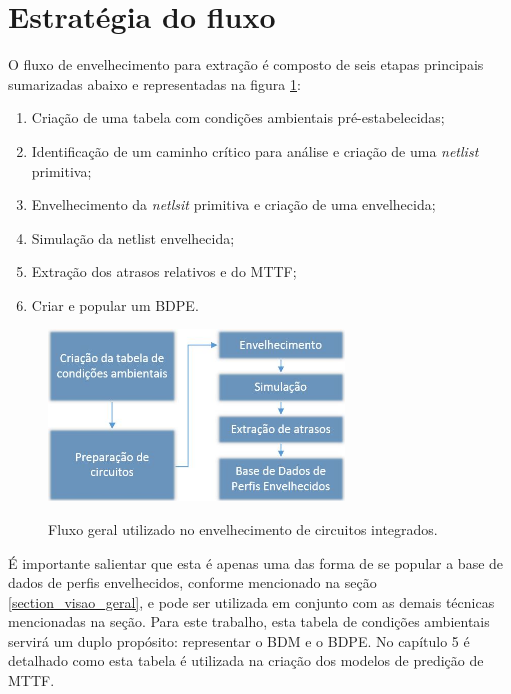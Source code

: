 \section{Estratégia do fluxo}
\label{section_estrategia_fluxo}
O fluxo de envelhecimento para extração é composto de seis etapas principais sumarizadas abaixo e representadas na figura \ref{figure:fluxo_geral}:
\begin{enumerate}
	\item Criação de uma tabela com condições ambientais pré-estabelecidas;
	\item Identificação de um caminho crítico para análise e criação de uma \textit{netlist} primitiva;
	\item Envelhecimento da \textit{netlsit} primitiva e criação de uma envelhecida;
	\item Simulação da netlist envelhecida;
	\item Extração dos atrasos relativos e do MTTF;
	\item Criar e popular um BDPE.
\end{enumerate}
\begin{figure}[H]
\center
{\includegraphics[width=0.7\textwidth]{images/fluxo_geral}}
\caption{Fluxo geral utilizado no envelhecimento de circuitos integrados.}
\label{figure:fluxo_geral}
\end{figure}
É importante salientar que esta é apenas uma das forma de se popular a base de dados de perfis envelhecidos, conforme mencionado na seção \ref{section_visao_geral}, e pode ser utilizada em conjunto com as demais técnicas mencionadas na seção. Para este trabalho, esta tabela de condições ambientais servirá um duplo propósito: representar o BDM e o BDPE. No capítulo 5 é detalhado como esta tabela é utilizada na criação dos modelos de predição de MTTF.

